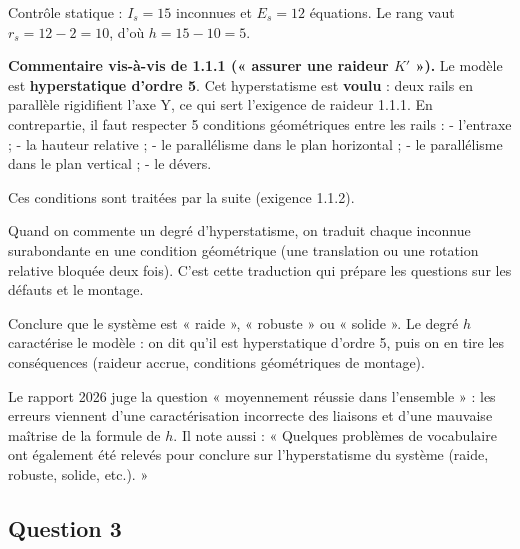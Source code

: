 \documentclass[11pt,a4paper]{article}
\newcommand{\equationajustee}[1]{%
  \sbox{\boiteequation}{$\displaystyle #1$}%
  \ifdim\wd\boiteequation>\linewidth
    \[\resizebox{\linewidth}{!}{\usebox{\boiteequation}}\]%
  \else
    \[#1\]%
  \fi}
\begin{document}
\equationajustee{\boxed{h = 5}}

Contrôle statique : \(I_s = 15\) inconnues et \(E_s = 12\) équations. Le rang vaut \(r_s = 12 - 2 = 10\), d'où \(h = 15 - 10 = 5\).

\textbf{Commentaire vis-à-vis de 1.1.1 (« assurer une raideur \(K'\) »).} Le modèle est \textbf{hyperstatique d'ordre 5}. Cet hyperstatisme est \textbf{voulu} : deux rails en parallèle rigidifient l'axe Y, ce qui sert l'exigence de raideur 1.1.1. En contrepartie, il faut respecter 5 conditions géométriques entre les rails :
- l'entraxe ;
- la hauteur relative ;
- le parallélisme dans le plan horizontal ;
- le parallélisme dans le plan vertical ;
- le dévers.

Ces conditions sont traitées par la suite (exigence 1.1.2).

\begin{methode}

Quand on commente un degré d'hyperstatisme, on traduit chaque inconnue surabondante en une condition géométrique (une translation ou une rotation relative bloquée deux fois). C'est cette traduction qui prépare les questions sur les défauts et le montage.

\end{methode}

\begin{piege}

Conclure que le système est « raide », « robuste » ou « solide ». Le degré \(h\) caractérise le modèle : on dit qu'il est hyperstatique d'ordre 5, puis on en tire les conséquences (raideur accrue, conditions géométriques de montage).

\end{piege}

\begin{jury}

Le rapport 2026 juge la question « moyennement réussie dans l'ensemble » : les erreurs viennent d'une caractérisation incorrecte des liaisons et d'une mauvaise maîtrise de la formule de \(h\). Il note aussi : « Quelques problèmes de vocabulaire ont également été relevés pour conclure sur l'hyperstatisme du système (raide, robuste, solide, etc.). »

\end{jury}

\hypertarget{question-3}{%
\subsection{Question 3}\label{question-3}}
\end{document}
